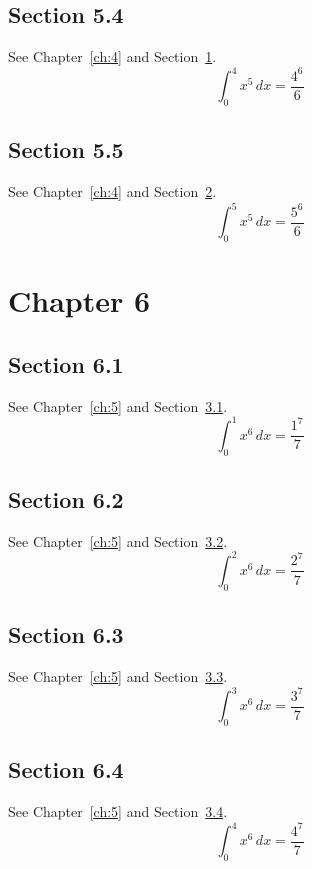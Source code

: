 \documentclass{book}
\begin{document}
\section{Section 5.4}\label{sec:5-4}
See Chapter~\ref{ch:4} and Section~\ref{sec:5-4}.
\lipsum[30-32]
\begin{equation}\label{eq:5-4} \int_0^{4} x^{5}\,dx = \frac{4^{6}}{6}\end{equation}
\section{Section 5.5}\label{sec:5-5}
See Chapter~\ref{ch:4} and Section~\ref{sec:5-5}.
\lipsum[31-33]
\begin{equation}\label{eq:5-5} \int_0^{5} x^{5}\,dx = \frac{5^{6}}{6}\end{equation}
\chapter{Chapter 6}\label{ch:6}
\section{Section 6.1}\label{sec:6-1}
See Chapter~\ref{ch:5} and Section~\ref{sec:6-1}.
\lipsum[32-34]
\begin{equation}\label{eq:6-1} \int_0^{1} x^{6}\,dx = \frac{1^{7}}{7}\end{equation}
\section{Section 6.2}\label{sec:6-2}
See Chapter~\ref{ch:5} and Section~\ref{sec:6-2}.
\lipsum[33-35]
\begin{equation}\label{eq:6-2} \int_0^{2} x^{6}\,dx = \frac{2^{7}}{7}\end{equation}
\section{Section 6.3}\label{sec:6-3}
See Chapter~\ref{ch:5} and Section~\ref{sec:6-3}.
\lipsum[34-36]
\begin{equation}\label{eq:6-3} \int_0^{3} x^{6}\,dx = \frac{3^{7}}{7}\end{equation}
\section{Section 6.4}\label{sec:6-4}
See Chapter~\ref{ch:5} and Section~\ref{sec:6-4}.
\lipsum[35-37]
\begin{equation}\label{eq:6-4} \int_0^{4} x^{6}\,dx = \frac{4^{7}}{7}\end{equation}
\end{document}
